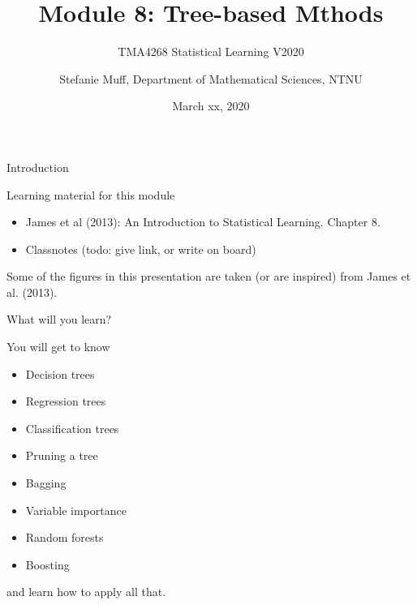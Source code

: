 \documentclass[10pt,ignorenonframetext,]{beamer}
\title{Module 8: Tree-based Mthods}
\subtitle{TMA4268 Statistical Learning V2020}
\author{Stefanie Muff, Department of Mathematical Sciences, NTNU}
\date{March xx, 2020}
\providecommand{\tightlist}{%
  \setlength{\itemsep}{0pt}\setlength{\parskip}{0pt}}
\begin{document}
\frame{\titlepage}

\begin{frame}{Introduction}

\begin{block}{Learning material for this module}

\begin{itemize}
\tightlist
\item
  James et al (2013): An Introduction to Statistical Learning. Chapter
  8.\\
\item
  Classnotes (todo: give link, or write on board)
\end{itemize}

Some of the figures in this presentation are taken (or are inspired)
from James et al. (2013).

\end{block}

\end{frame}

\begin{frame}

\begin{block}{What will you learn?}

\vspace{2mm}

You will get to know

\begin{itemize}
\tightlist
\item
  Decision trees\\
\item
  Regression trees\\
\item
  Classification trees\\
\item
  Pruning a tree
\item
  Bagging
\item
  Variable importance
\item
  Random forests
\item
  Boosting
\end{itemize}

and learn how to apply all that.

\end{block}

\end{frame}
\end{document}
